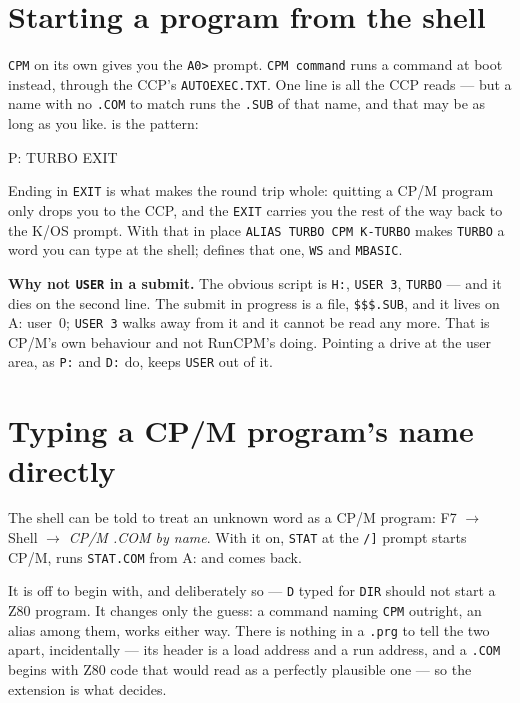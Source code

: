 \section{Starting a program from the shell}
\verb|CPM| on its own gives you the \verb|A0>| prompt. \verb|CPM command|
runs a command at boot instead, through the CCP's \texttt{AUTOEXEC.TXT}.
One line is all the CCP reads --- but a name with no \texttt{.COM} to
match runs the \texttt{.SUB} of that name, and that may be as long as you
like.  is the pattern:

\begin{type}
P:
TURBO
EXIT
\end{type}

Ending in \verb|EXIT| is what makes the round trip whole: quitting a CP/M
program only drops you to the CCP, and the \verb|EXIT| carries you the
rest of the way back to the K/OS prompt. With that in place
\verb|ALIAS TURBO CPM K-TURBO| makes \verb|TURBO| a word you can type at
the shell;  defines that one, \verb|WS|
and \verb|MBASIC|.

\begin{aside}
\textbf{Why not \texttt{USER} in a submit.} The obvious script is
\verb|H:|, \verb|USER 3|, \verb|TURBO| --- and it dies on the second line.
The submit in progress is a file, \texttt{\$\$\$.SUB}, and it lives on
A: user~0; \verb|USER 3| walks away from it and it cannot be read any
more. That is CP/M's own behaviour and not RunCPM's doing. Pointing a
drive at the user area, as \verb|P:| and \verb|D:| do, keeps \verb|USER|
out of it.
\end{aside}

\section{Typing a CP/M program's name directly}
The shell can be told to treat an unknown word as a CP/M program: F7
\(\rightarrow\) Shell \(\rightarrow\) \emph{CP/M .COM by name}. With it on,
\verb|STAT| at the \verb|/]| prompt starts CP/M, runs \texttt{STAT.COM}
from A: and comes back.

It is off to begin with, and deliberately so --- \verb|D| typed for
\verb|DIR| should not start a Z80 program. It changes only the guess: a
command naming \verb|CPM| outright, an alias among them, works either way.
There is nothing in a \texttt{.prg} to tell the two apart, incidentally ---
its header is a load address and a run address, and a \texttt{.COM} begins
with Z80 code that would read as a perfectly plausible one --- so the
extension is what decides.

